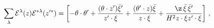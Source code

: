 \begin{equation}\label{eq:prop1}
\sum_{\lambda}{\cal E}^{\lambda}(z){\cal
E}^{*\lambda}(z'^{*})=\left[-
\theta\cdot\theta'+\frac{(\theta\cdot
z')\bar\xi'}{z'\cdot\xi}+\frac{(\theta'\cdot
z)\bar\xi}{z\cdot\xi}+\frac{\z\,\bar\xi\,\bar\xi'}{H^{2}z\cdot\xi
z'\cdot\xi}\right]\,,
\end{equation}

